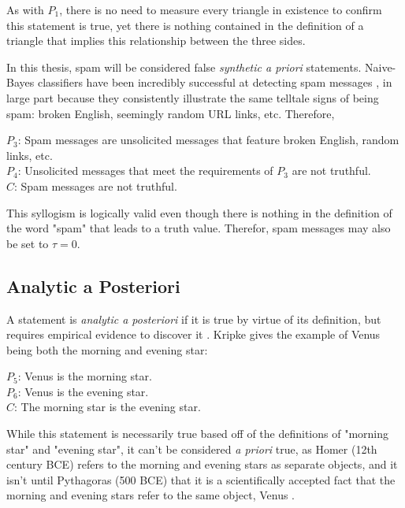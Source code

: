 \documentclass[preprint,review,12pt]{elsarticle}
\begin{document}
As with $P_1$, there is no need to measure every triangle in existence to confirm this statement is true, yet there is nothing contained in the definition of a triangle that implies this relationship between the three sides.

In this thesis, spam will be considered false \textit{synthetic a priori} statements. Naive-Bayes classifiers have been incredibly successful at detecting spam messages \cite{wang2010detecting,xu2019exploiting,ahmed2018detecting}, in large part because they consistently illustrate the same telltale signs of being spam: broken English, seemingly random URL links, etc. Therefore, \begin{center}
    $P_3$: Spam messages are unsolicited messages that feature broken English, random links, etc. \\
$P_4$: Unsolicited messages that meet the requirements of $P_3$ are not truthful.\\
$C$: Spam messages are not truthful.
\end{center}
 
This syllogism is logically valid even though there is nothing in the definition of the word "spam" that leads to a truth value. Therefor, spam messages may also be set to $\tau = 0$.


\subsection{Analytic a Posteriori}
A statement is \textit{analytic a posteriori} if it is true by virtue of its definition, but requires empirical evidence to discover it \cite{kripke1972naming}. Kripke gives the example of Venus being both the morning and evening star: \begin{center}
   $P_5$: Venus is the morning star.\\
$P_6$: Venus is the evening star.\\
$C$: The morning star is the evening star. 
\end{center}


While this statement is necessarily true based off of the definitions of "morning star" and "evening star", it can't be considered \textit{a priori} true, as Homer (12th century BCE) refers to the morning and evening stars as separate objects, and it isn't until Pythagoras (500 BCE) that it is a scientifically accepted fact that the morning and evening stars refer to the same object, Venus \cite{dunne1978voyage}.
\end{document}
